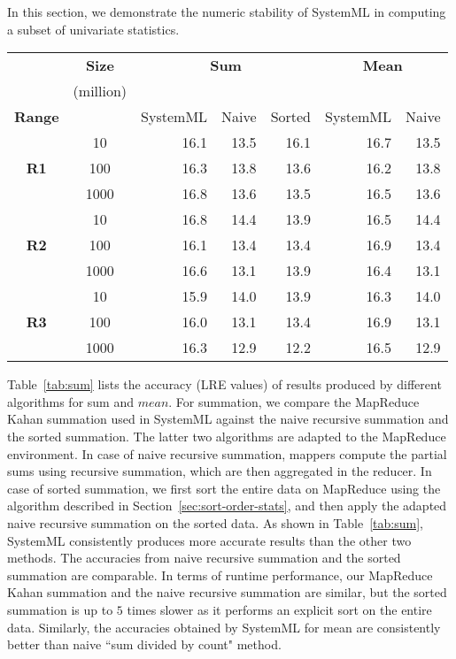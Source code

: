 
In this section, we demonstrate the numeric stability of SystemML in computing a subset of univariate statistics. 

\begin{table*}[thb]
\caption{Numerical Accuracy of Sum and Mean (LRE values)}
\label{tab:sum}
\centering
\begin{tabular}{|c|c|r|r|r|r|r|}
\hline
 & \textbf{Size} & \multicolumn{3}{|c|}{\textbf{Sum}} &  \multicolumn{2}{|c|}{\textbf{Mean}}\\
 & (million) & \multicolumn{3}{|c|}{} &  \multicolumn{2}{|c|}{}\\
\hline
\textbf{Range} & & SystemML & Naive & Sorted & SystemML & Naive\\ 
\hline
             & 10   & 16.1 & 13.5 & 16.1 & 16.7 & 13.5 \\
\textbf{R1}  & 100  & 16.3 & 13.8 & 13.6 & 16.2 & 13.8 \\
             & 1000 & 16.8 & 13.6 & 13.5 & 16.5 & 13.6 \\
\hline
\hline
             & 10   & 16.8 & 14.4 & 13.9 & 16.5 & 14.4 \\
\textbf{R2}  & 100  & 16.1 & 13.4 & 13.4 & 16.9 & 13.4 \\
             & 1000 & 16.6 & 13.1 & 13.9 & 16.4 & 13.1 \\
\hline
\hline
             & 10   & 15.9 & 14.0 & 13.9 & 16.3 & 14.0 \\
\textbf{R3}  & 100  & 16.0 & 13.1 & 13.4 & 16.9 & 13.1 \\
             & 1000 & 16.3 & 12.9 & 12.2 & 16.5 & 12.9 \\
\hline
\end{tabular}
\end{table*}

Table~\ref{tab:sum} lists the accuracy (LRE values) of results produced by different algorithms for sum and $mean$. For summation, we compare the MapReduce Kahan summation used in SystemML against the naive recursive summation and the sorted summation. The latter two algorithms are adapted to the MapReduce environment. In case of naive recursive summation, mappers compute the partial sums using recursive summation, which are then aggregated in the reducer. 
In case of sorted summation, we first sort the entire data on MapReduce using the algorithm described in Section~\ref{sec:sort-order-stats}, and then apply the adapted naive recursive summation on the sorted data. As shown in Table~\ref{tab:sum}, SystemML consistently produces more accurate results than the other two methods. The accuracies from naive recursive summation and the sorted summation are comparable. In terms of runtime performance, our MapReduce Kahan summation and the naive recursive summation are similar, but the sorted summation is up to $5$ times slower as it performs an explicit sort on the entire data. Similarly, the accuracies obtained by SystemML for mean are consistently better than naive ``sum divided by count" method.

